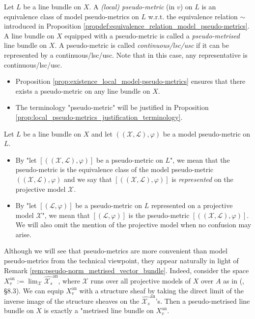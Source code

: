 \documentclass [11pt,reqno]{amsart}
\newcommand{\1}{\mathmybb{1}}
\def\cL{{\mathcal{L}}}
\def\cX{{\mathcal{X}}}
\def\an{\operatorname{an}}
\begin{document}
\begin{definition}
\label{def:pseudo-metric}
Let $L$ be a line bundle on $X$. A \emph{(local) pseudo-metric} (in $v$) on $L$ is an equivalence class of model pseudo-metrics on $L$ w.r.t. the equivalence relation $\sim$ introduced in Proposition \ref{propdef:equivalence_relation_model_pseudo-metrics}. A line bundle on $X$ equipped with a pseudo-metric is called a \emph{pseudo-metrised} line bundle on $X$. A pseudo-metric is called \emph{continuous/lsc/usc} if it can be represented by a continuous/lsc/usc. Note that in this case, any representative is continuous/lsc/usc.
\end{definition}

\begin{remark}
\label{rem:existence_local_pseudo-metrics}
\begin{itemize}
	\item[(1)] Proposition \ref{prop:existence_local_model-pseudo-metrics} ensures that there exists a pseudo-metric on any line bundle on $X$.
	\item[(2)] The terminology "pseudo-metric" will be justified in Proposition \ref{prop:local_pseudo-metrics_justification_terminology}.
\end{itemize}
\end{remark}

\begin{notation}
\label{notation:pseudo-metric}
Let $L$ be a line bundle on $X$ and let $((\cX,\cL),\varphi)$ be a model pseudo-metric on $L$. 
\begin{itemize}
	\item[(1)] By "let $[((\cX,\cL),\varphi)]$ be a pseudo-metric on $L$", we mean that the pseudo-metric is the equivalence class of the model pseudo-metric $((\cX,\cL),\varphi)$ and we say that $[((\cX,\cL),\varphi)]$ is \emph{represented} on the projective model $\cX$.
	\item[(2)] By "let $[(\cL,\varphi)]$ be a pseudo-metric on $L$ represented on a projective model $\cX$", we mean that $[(\cL,\varphi)]$ is the pseudo-metric $[((\cX,\cL),\varphi)]$. We will also omit the mention of the projective model when no confusion may arise.
\end{itemize}
\end{notation}


\begin{remark}
\label{rem:pseudo-metric_Zariski-Riemann}
Although we will see that pseudo-metrics are more convenient than model pseudo-metrics from the technical viewpoint, they appear naturally in light of Remark \ref{rem:pseudo-norm_metrised_vector_bundle}. Indeed, consider the space $X_{v}^{\an}:=\lim_{\cX} \widehat{\cX_{s}}^{\an}$, where $\cX$ runs over all projective models of $X$ over $A$ as in (\cite{Sedillot_pav}, \S 8.3). We can equip $X_{v}^{\an}$ with a structure sheaf by taking the direct limit of the inverse image of the structure sheaves on the $\widehat{\cX_{s}}^{\an}$'s. Then a pseudo-metrised line bundle on $X$ is exactly a "metrised line bundle on $X_{v}^{\an}$. 
\end{remark}
\end{document}
